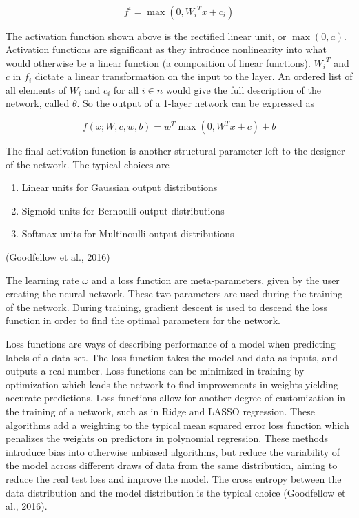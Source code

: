 \documentclass[12pt,twoside]{reedthesis}
\providecommand{\tightlist}{%
  \setlength{\itemsep}{0pt}\setlength{\parskip}{0pt}}
\begin{document}
\[
f^i = \max ( 0 , {W_i}^T x + c_i)
\]

The activation function shown above is the rectified linear unit, or
\(\max(0,a)\). Activation functions are significant as they introduce
nonlinearity into what would otherwise be a linear function (a
composition of linear functions). \({W_i}^T\) and \(c\) in \(f_i\)
dictate a linear transformation on the input to the layer. An ordered
list of all elements of \(W_i\) and \(c_i\) for all \(i \in n\) would
give the full description of the network, called \(\theta\). So the
output of a 1-layer network can be expressed as

\[
f(x; W, c, w, b) = w^T \max( 0 , W^T x +c ) +b
\]

The final activation function is another structural parameter left to
the designer of the network. The typical choices are
\begin{enumerate}
\def\labelenumi{\arabic{enumi}.}
\tightlist
\item
  Linear units for Gaussian output distributions
\item
  Sigmoid units for Bernoulli output distributions
\item
  Softmax units for Multinoulli output distributions
\end{enumerate}
(Goodfellow et al., 2016)

The learning rate \(\omega\) and a loss function are meta-parameters,
given by the user creating the neural network. These two parameters are
used during the training of the network. During training, gradient
descent is used to descend the loss function in order to find the
optimal parameters for the network.

Loss functions are ways of describing performance of a model when
predicting labels of a data set. The loss function takes the model and
data as inputs, and outputs a real number. Loss functions can be
minimized in training by optimization which leads the network to find
improvements in weights yielding accurate predictions. Loss functions
allow for another degree of customization in the training of a network,
such as in Ridge and LASSO regression. These algorithms add a weighting
to the typical mean squared error loss function which penalizes the
weights on predictors in polynomial regression. These methods introduce
bias into otherwise unbiased algorithms, but reduce the variability of
the model across different draws of data from the same distribution,
aiming to reduce the real test loss and improve the model. The cross
entropy between the data distribution and the model distribution is the
typical choice (Goodfellow et al., 2016).
\end{document}
